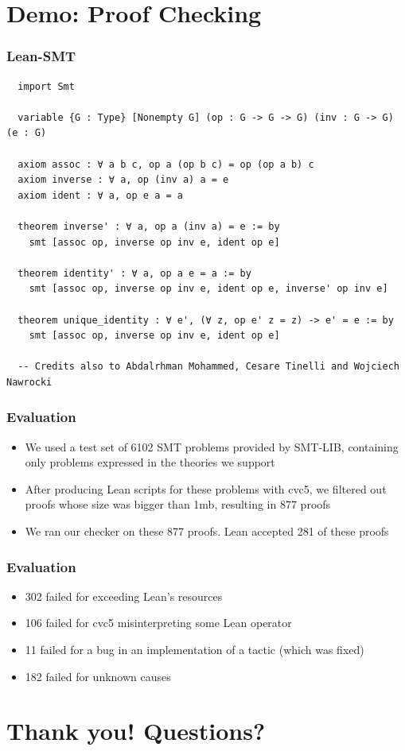 \documentclass[usepdftitle=false,aspectratio=169,usenames,dvipsnames]{beamer}
\newcommand\vitem{\vfill\item}
\begin{document}



\section{Demo: Proof Checking}

\begin{frame}[fragile]
  \frametitle{Lean-SMT}
  \begin{verbatim}
  import Smt

  variable {G : Type} [Nonempty G] (op : G -> G -> G) (inv : G -> G) (e : G)

  axiom assoc : ∀ a b c, op a (op b c) = op (op a b) c
  axiom inverse : ∀ a, op (inv a) a = e
  axiom ident : ∀ a, op e a = a

  theorem inverse' : ∀ a, op a (inv a) = e := by
    smt [assoc op, inverse op inv e, ident op e]

  theorem identity' : ∀ a, op a e = a := by
    smt [assoc op, inverse op inv e, ident op e, inverse' op inv e]

  theorem unique_identity : ∀ e', (∀ z, op e' z = z) -> e' = e := by
    smt [assoc op, inverse op inv e, ident op e]

  -- Credits also to Abdalrhman Mohammed, Cesare Tinelli and Wojciech Nawrocki
  \end{verbatim}
\end{frame}

\begin{frame}
  \frametitle{Evaluation}
  \begin{itemize}
    \item We used a test set of 6102 SMT problems provided by SMT-LIB, containing only problems expressed in the theories we support
    \vitem After producing Lean scripts for these problems with cvc5, we filtered out proofs whose size was bigger than 1mb, resulting in 877 proofs
    \vitem We ran our checker on these 877 proofs. Lean accepted 281 of these proofs
  \end{itemize}
\end{frame}

\begin{frame}
  \frametitle{Evaluation}
  \begin{itemize}
    \item 302 failed for exceeding Lean's resources
    \vitem 106 failed for cvc5 misinterpreting some Lean operator
    \vitem 11 failed for a bug in an implementation of a tactic (which was fixed)
    \vitem 182 failed for unknown causes
  \end{itemize}
\end{frame}

\section{Thank you! Questions?}


\end{document}

